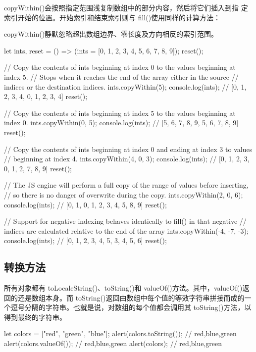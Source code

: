 copyWithin()会按照指定范围浅复制数组中的部分内容，然后将它们插入到指
定索引开始的位置。开始索引和结束索引则与 fill()使用同样的计算方法：

copyWithin()静默忽略超出数组边界、零长度及方向相反的索引范围。
\begin{js}
    let ints,
    reset = () => (ints = [0, 1, 2, 3, 4, 5, 6, 7, 8, 9]);
    reset();

    // Copy the contents of ints beginning at index 0 to the values beginning at index 5.
    // Stops when it reaches the end of the array either in the source
    // indices or the destination indices.
    ints.copyWithin(5);
    console.log(ints); // [0, 1, 2, 3, 4, 0, 1, 2, 3, 4]
    reset();

    // Copy the contents of ints beginning at index 5 to the values beginning at index 0.
    ints.copyWithin(0, 5);
    console.log(ints); // [5, 6, 7, 8, 9, 5, 6, 7, 8, 9]
    reset();

    // Copy the contents of ints beginning at index 0 and ending at index 3 to values
    // beginning at index 4.
    ints.copyWithin(4, 0, 3);
    console.log(ints); // [0, 1, 2, 3, 0, 1, 2, 7, 8, 9]
    reset();

    // The JS engine will perform a full copy of the range of values before inserting,
    // so there is no danger of overwrite during the copy.
    ints.copyWithin(2, 0, 6);
    console.log(ints); // [0, 1, 0, 1, 2, 3, 4, 5, 8, 9]
    reset();

    // Support for negative indexing behaves identically to fill() in that negative
    // indices are calculated relative to the end of the array
    ints.copyWithin(-4, -7, -3);
    console.log(ints); // [0, 1, 2, 3, 4, 5, 3, 4, 5, 6]
    reset();

\end{js}
\subsection{转换方法}
所有对象都有 toLocaleString()、toString()和 valueOf()方法。其中，valueOf()返回的还是数组本身。而 toString()返回由数组中每个值的等效字符串拼接而成的一个逗号分隔的字符串。也就是说，对数组的每个值都会调用其 toString()方法，以得到最终的字符串。
\begin{js}
    let colors = ["red", "green", "blue"];
    alert(colors.toString()); // red,blue,green
    alert(colors.valueOf()); // red,blue,green
    alert(colors); // red,blue,green
\end{js}

